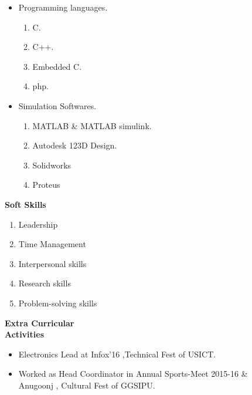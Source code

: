 \documentclass[11pt]{article}
\begin{document}
\begin{itemize}
\vspace{-0.60in}	                                     		\addtolength{\itemindent}{1in}	                                     \item Programming languages.
{\begin{enumerate}
\addtolength{\itemindent}{1.359in}                             		\item C.
\item C++.
\item Embedded C.
\item php.
\end{enumerate}
}
\item  Simulation Softwares.
{\begin{enumerate}
\addtolength{\itemindent}{1.359in}                             		\item MATLAB \& MATLAB simulink.
\item Autodesk 123D Design.
\item Solidworks 
\item Proteus
\end{enumerate}
}
\end{itemize}

\begin{flushleft}
\Large \textbf{Soft Skills}\small
\begin{flushright} 
\begin{enumerate}
\addtolength{\itemindent}{1.7in}  
\item Leadership
\item Time Management	
\item Interpersonal skills
\item Research skills 
\item Problem-solving skills
\end{enumerate} 
\end{flushright}
\end{flushleft}	

\begin{flushleft}
{\Large \bf{Extra Curricular\\ Activities}}
\begin{itemize}
\addtolength{\itemindent}{1.7in}
\item Electronics Lead at Infox'16 ,Technical Fest of USICT.
\item Worked as Head Coordinator in Annual Sports-Meet 2015-16 \&\\ \addtolength{\itemindent}{1.7in}Anugoonj , Cultural Fest of GGSIPU.
\end{itemize}
\end{flushleft}                                    		
\end{document}
